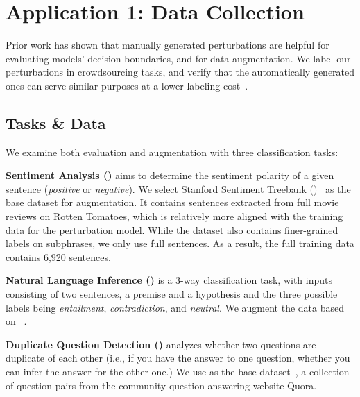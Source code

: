 \section{Application 1: Data Collection}
\label{sec:app_label}



Prior work has shown that manually generated perturbations are helpful for evaluating models' decision boundaries, and for data augmentation.
We label our perturbations in crowdsourcing tasks, and verify that the automatically generated ones can serve similar purposes at a lower labeling cost~\cite{Khashabi2020MoreBF}.

\subsection{Tasks \& Data}

We examine both evaluation and augmentation with three classification tasks: 

\textbf{Sentiment Analysis (\sst)} aims to determine the sentiment polarity of a given sentence (\emph{positive} or \emph{negative}). 
We select Stanford Sentiment Treebank (\dsst)~\cite{socher2013recursive} as the base dataset for augmentation.
It contains sentences extracted from full movie reviews on Rotten Tomatoes, which is relatively more aligned with the training data for the perturbation model. 
While the dataset also contains finer-grained labels on subphrases, we only use full sentences.
As a result, the full training data contains 6,920 sentences.

\textbf{Natural Language Inference (\nli)} is a 3-way classification task, with inputs consisting of two sentences, a premise and a hypothesis and the three possible labels being \emph{entailment}, \emph{contradiction}, and \emph{neutral}.
 We augment the data based on \dnli~\cite{bowman-etal-2015-large}. 
 
\textbf{Duplicate Question Detection (\qqp)} analyzes whether two questions are duplicate of each other (i.e., if you have the answer to one question, whether you can infer the answer for the other one.) 
We use \dqqp as the base dataset~\cite{wang2018glue}, a collection of question pairs from the community question-answering website Quora.



